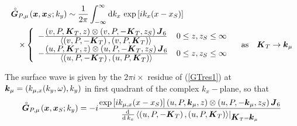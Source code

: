 \begin{samepage}
\begin{eqnarray}\label{GTres1}
\lefteqn{\rf{\bmi G}_{P,\mu}\!({\bmi x},{\bmi x}_{S};k_{y}) \sim 
\frac{1}{2 \pi}\int_{-\infty}^{\infty} {\rm d}k_x\, 
\exp\left[{i{k}_{x }({x-{x}_{S}})}\right]}\\
&&
\times\left\{
{\begin{array}{ll}
-\frac{\textstyle \left({ v,P,{\bmi K}_{T},z}\right) \otimes
\left({ v,P,-{\bmi K}_{T},z_S}\right) {\bmi  J}_{6}}
{\textstyle \left\langle{\left({v,P,-{\bmi K}_{T}}\right),
\left({v,P,{\bmi K}_{T}}\right)}\right\rangle}& 
0 \le z,z_{S} \le \infty \\
-\frac{\textstyle \left({ u,P,{\bmi K}_{T},z}\right) \otimes
\left({ u,P,-{\bmi K}_{T},z_S}\right) {\bmi  J}_{6}}
{\textstyle \left\langle{\left({u,P,-{\bmi K}_{T}}\right),
\left({u,P,{\bmi K}_{T}}\right)}\right\rangle}& 
0 \le z,z_{S} \le \infty 
\end{array} }\right. \quad \mbox{as} \quad {\bmi K}_{T}\rightarrow {\bmi k}_{\mu}
\nonumber
\end{eqnarray} 
\end{samepage}
The surface wave is given 
by the $ 2 \pi i \times$ {residue of } (\ref{GTres1}) at $
{\mbox{\boldmath$\mit k$\unboldmath}}_{ \mu }=(k_{\mu, x}(k_{ y},\omega), k_{ y})$  in first quadrant
of the complex $k_x-$plane, so that
\begin{equation} 	\label{pole1}
	\stackrel{\scriptscriptstyle _{\,\,\circ}}{ \mbox{\boldmath$\mit G$\unboldmath}}_{P,\mu}\!({\mbox{\boldmath$\mit x$\unboldmath}},{\mbox{\boldmath$\mit x$\unboldmath}}_{S};k_{y})=
	-i {\frac{\exp\left[{i{k}_{ \mu,x }({x-{x}_{S}})}\right]
	\left({ u,P,{\mbox{\boldmath$\mit k$\unboldmath}}_{ \mu 	},{z}}\right)\otimes 
	\left({ u,P,-{\mbox{\boldmath$\mit k$\unboldmath}}_{ \mu },{z}_{S}}\right)
	{ \mbox{\boldmath$\mit J$\unboldmath}}_{6} }{ {\frac{{\rm d}\,}{ {\rm d}\,{k}_{x}}} 
	{\left.{\left\langle{\left({ u,P,-{\mbox{\boldmath$\mit K$\unboldmath}}_{T}}\right) , 
	\left({u,P,{\mbox{\boldmath$\mit K$\unboldmath}}_{T}}\right)}\right\rangle}\right|}_{{\mbox{\boldmath$\mit K$\unboldmath}}_{T} =
	{\mbox{\boldmath$\mit k$\unboldmath}}_{ \mu }}}}  
\end{equation}

